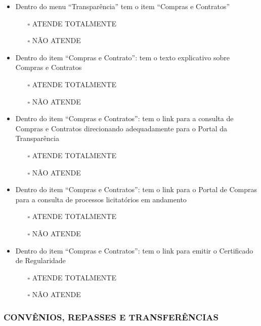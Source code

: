 \documentclass[
]{book}
\providecommand{\tightlist}{%
  \setlength{\itemsep}{0pt}\setlength{\parskip}{0pt}}
\begin{document}
\begin{itemize}
\tightlist
\item
  Dentro do menu ``Transparência'' tem o item ``Compras e Contratos''

  \begin{itemize}
  \tightlist
  \item[$\square$]
    ATENDE TOTALMENTE
  \item[$\square$]
    NÃO ATENDE
  \end{itemize}
\item
  Dentro do item ``Compras e Contrato'': tem o texto explicativo sobre Compras e Contratos

  \begin{itemize}
  \tightlist
  \item[$\square$]
    ATENDE TOTALMENTE
  \item[$\square$]
    NÃO ATENDE
  \end{itemize}
\item
  Dentro do item ``Compras e Contratos'': tem o link para a consulta de Compras e Contratos direcionando adequadamente para o Portal da Transparência

  \begin{itemize}
  \tightlist
  \item[$\square$]
    ATENDE TOTALMENTE
  \item[$\square$]
    NÃO ATENDE
  \end{itemize}
\item
  Dentro do item ``Compras e Contratos'': tem o link para o Portal de Compras para a consulta de processos licitatórios em andamento

  \begin{itemize}
  \tightlist
  \item[$\square$]
    ATENDE TOTALMENTE
  \item[$\square$]
    NÃO ATENDE
  \end{itemize}
\item
  Dentro do item ``Compras e Contratos'': tem o link para emitir o Certificado de Regularidade

  \begin{itemize}
  \tightlist
  \item[$\square$]
    ATENDE TOTALMENTE
  \item[$\square$]
    NÃO ATENDE
  \end{itemize}
\end{itemize}

\hypertarget{convuxeanios-repasses-e-transferuxeancias-1}{%
\subsubsection*{CONVÊNIOS, REPASSES E TRANSFERÊNCIAS}\label{convuxeanios-repasses-e-transferuxeancias-1}}
\end{document}
